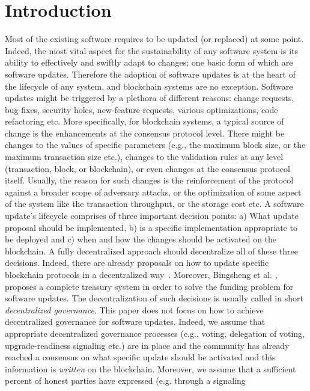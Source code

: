 \section{Introduction}

Most of the existing software requires to be updated (or replaced) at some point. Indeed, the most vital aspect for the sustainability of any software system is its ability to effectively and swiftly adapt to changes; one basic form of which are software updates. Therefore the adoption of software updates is at the heart of the lifecycle of any system, and blockchain systems are no exception. Software updates might be triggered by a plethora of different reasons: change requests, bug-fixes, security holes, new-feature requests, various optimizations, code refactoring etc.
More specifically, for blockchain systems, a typical source of change is the 
enhancements at the consensus protocol level. There might be changes to the 
values of specific parameters (e.g., the maximum block size, or the maximum 
transaction size etc.), changes to the validation rules at any level 
(transaction, block, or blockchain), or even changes at the consensus protocol 
itself. Usually, the reason for such changes is the reinforcement of the 
protocol against a broader scope of adversary attacks, or the optimization of 
some aspect of the system like the transaction throughput, or the storage cost 
etc.
A software update's lifecycle comprises of three important decision points: a) 
What update proposal should be implemented, b) is a specific implementation 
appropriate to be deployed and c) when and how the changes should be activated on the 
blockchain. A fully decentralized approach should decentralize all of these 
three decisions. Indeed, there are already proposals on how to update specific 
blockchain protocols in a decentralized way~\cite{dash,decred,tezos}. Moreover, 
Bingsheng et al. \cite{NDSS:ZhaOliBal19}, proposes a complete treasury system in
order to solve the funding problem for software updates. The decentralization 
of such decisions is usually called in short \emph{decentralized governance}.
This paper does not focus on how to achieve decentralized governance for 
software updates. Indeed, we assume that appropriate decentralized governance processes (e.g., voting, 
delegation of voting, upgrade-readiness signaling etc.) are in place and the 
community has already reached a consensus on what specific update should be activated and this information is \emph{written} on the blockchain. Moreover, we assume that 
a sufficient percent of honest parties have expressed (e.g. through a signaling 
